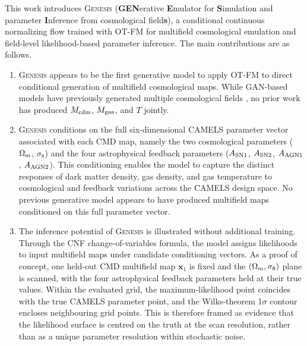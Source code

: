 \documentclass[usenatbib]{mnras}
\newcommand{\Mcdm}{M_{\rm cdm}}
\newcommand{\Mgas}{M_{\rm gas}}
\newcommand{\Tgas}{T}
\newcommand{\Om}{\Omega_{\rm m}}
\newcommand{\sig}{\sigma_8}
\begin{document}
This work introduces \textsc{Genesis}
(\textbf{GEN}erative \textbf{E}mulator for
\textbf{S}imulation and parameter \textbf{I}nference from cosmological field\textbf{s}),
a conditional continuous normalizing flow trained with OT-FM for
multifield cosmological emulation and field-level likelihood-based
parameter inference. The main contributions are as follows.
\begin{enumerate}[label=\arabic*., leftmargin=*, labelsep=0.5em]
  \item \textsc{Genesis} appears to be the first
        generative model to apply OT-FM to direct conditional
        generation of multifield cosmological maps.
        While GAN-based models have previously generated multiple
        cosmological fields \citep{Andrianomena2022,Andrianomena2024},
        no prior work has produced $\Mcdm$,
        $\Mgas$, and $\Tgas$ jointly.

  \item \textsc{Genesis} conditions on the full six-dimensional
        CAMELS parameter vector associated with each CMD map, namely
        the two cosmological parameters ($\Om$, $\sig$) and the four
        astrophysical feedback parameters
        ($A_{\rm SN1}$, $A_{\rm SN2}$, $A_{\rm AGN1}$, $A_{\rm AGN2}$).
        This conditioning enables the model to capture the distinct
        responses of dark matter density, gas density, and gas
        temperature to cosmological and feedback variations across the
        CAMELS design space. No previous generative model appears to
        have produced multifield maps conditioned on this full
        parameter vector.

  \item The inference potential of \textsc{Genesis} is illustrated
        without additional training. Through the CNF change-of-variables
        formula, the model assigns likelihoods to input multifield maps
        under candidate conditioning vectors. As a proof of concept,
        one held-out CMD multifield map $\mathbf{x}_1$ is fixed and
        the $(\Om,\sig)$ plane is scanned, with the four astrophysical
        feedback parameters held at their true values. Within the evaluated
        grid, the maximum-likelihood point coincides with the true
        CAMELS parameter point, and the
        Wilks-theorem 1$\sigma$ contour encloses neighbouring grid
        points. This is therefore framed as evidence that the likelihood
        surface is centred on the truth at the scan resolution, rather
        than as a unique parameter resolution within stochastic noise.
\end{enumerate}
\end{document}

